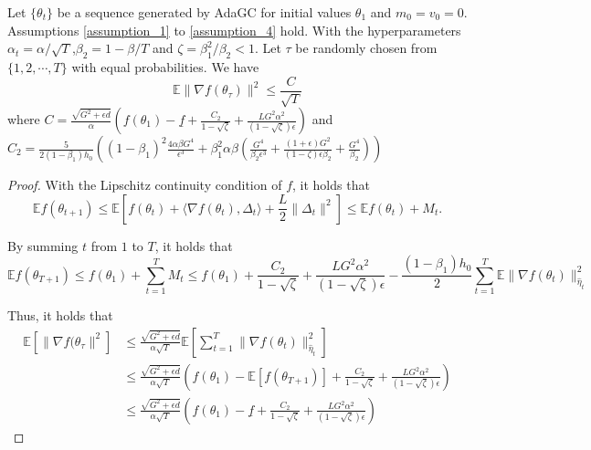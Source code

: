 \begin{theorem}
    Let $\{\theta_t\}$ be a sequence generated by AdaGC for initial values $\theta_1$ and $m_0 = v_0 = 0$. Assumptions \ref{assumption_1} to \ref{assumption_4} hold. With the hyperparameters $\alpha_t = \alpha/\sqrt{T}$,$\beta_2 = 1-\beta/T$ and $\zeta = \beta_1^2/\beta_2 < 1$. Let $\tau$ be randomly chosen from $\{1,2,\cdots, T\}$ with equal probabilities. We have
    \[
    \mathbb{E} \|\nabla f(\theta_\tau)\|^2 \leq \frac{C}{\sqrt{T}}
    \]
    where $C = \frac{\sqrt{G^2+\epsilon d}}{\alpha}\left(f(\theta_1) - \underline{f} +  \frac{C_2}{1-\sqrt{\zeta}} + \frac{LG^2\alpha^2}{(1-\sqrt{\zeta})\epsilon}\right)$ and $C_2 = \frac{5}{2(1-\beta_1)h_0 } \left((1-\beta_1)^2 \frac{4\alpha \beta G^4}{\epsilon^3} + \beta_1^2 \alpha\beta \left(\frac{G^4}{\beta_2 \epsilon^3} + \frac{(1+\epsilon) G^2}{(1-\zeta) \epsilon \beta_2} + \frac{G^4}{\beta_2}\right)\right)$
\end{theorem}
\begin{proof}
    With the Lipschitz continuity condition of $f$, it holds that
    \[
    \mathbb{E} f(\theta_{t+1}) \leq \mathbb{E} \left[f(\theta_t) + \langle \nabla f(\theta_t), \Delta_t\rangle + \frac{L}{2} \|\Delta_t\|^2\right] \leq \mathbb{E} f(\theta_t) + M_t.
    \]

    By summing $t$ from $1$ to $T$, it holds that
    \[
    \mathbb{E} f(\theta_{T+1}) \leq f(\theta_1) + \sum_{t=1}^T M_t \leq f(\theta_1) + \frac{C_2}{1-\sqrt{\zeta}} + \frac{LG^2\alpha^2}{(1-\sqrt{\zeta})\epsilon} - \frac{(1-\beta_1)h_0}{2}\sum_{t=1}^T\mathbb{E} \|\nabla f(\theta_t)\|_{\hat{\eta}_t}^2
    \]

    Thus, it holds that
    \[
    \begin{split}
    \mathbb{E} \left[\|\nabla f(\theta_\tau\|^2\right] &\leq \frac{\sqrt{G^2+\epsilon d}}{\alpha\sqrt{T}}\mathbb{E} \left[\sum_{t=1}^T \|\nabla f(\theta_t)\|_{\hat{\eta}_t}^2\right]\\
    &\leq \frac{\sqrt{G^2+\epsilon d}}{\alpha\sqrt{T}}\left(f(\theta_1) - \mathbb{E} [f(\theta_{T+1})] +  \frac{C_2}{1-\sqrt{\zeta}} + \frac{LG^2\alpha^2}{(1-\sqrt{\zeta})\epsilon}\right) \\\
    & \leq \frac{\sqrt{G^2+\epsilon d}}{\alpha\sqrt{T}}\left(f(\theta_1) - \underline{f} +  \frac{C_2}{1-\sqrt{\zeta}} + \frac{LG^2\alpha^2}{(1-\sqrt{\zeta})\epsilon}\right)
    \end{split}
    \]
\end{proof}



